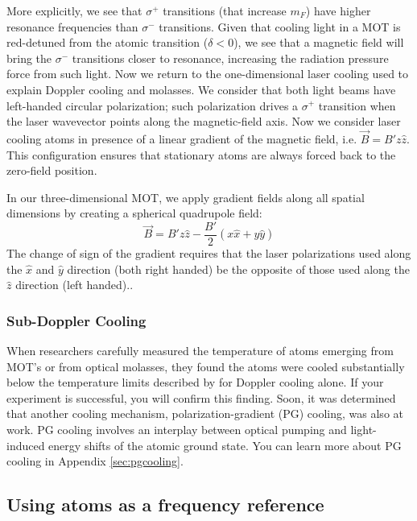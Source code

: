 \documentclass{../lab}
\begin{document}
More explicitly, we see that $\sigma^+$ transitions (that increase $m_F$) have higher resonance frequencies than $\sigma^-$ transitions. Given that cooling light in a MOT is red-detuned from the atomic transition ($\delta <0$), we see that a magnetic field will bring the $\sigma^-$ transitions closer to resonance, increasing the radiation pressure force from such light. Now we return to the one-dimensional laser cooling used to explain Doppler cooling and molasses. We consider that both light beams have left-handed circular polarization; such polarization drives a $\sigma^+$ transition when the laser wavevector points along the magnetic-field axis. Now we consider laser cooling atoms in presence of a linear gradient of the magnetic field, i.e. $\vec{B} = B'z\hat{z}$. This configuration ensures that stationary atoms are always forced back to the zero-field position.

In our three-dimensional MOT, we apply gradient fields along all spatial dimensions by creating a spherical quadrupole field:
\begin{equation}
    \vec{B} = B'z\hat{z} - \frac{B'}{2}(x\hat{x} + y\hat{y})
\end{equation}
The change of sign of the gradient requires that the laser polarizations used along the $\hat{x}$ and $\hat{y}$ direction (both right handed) be the opposite of those used along the $\hat{z}$ direction (left handed)..

\subsubsection{Sub-Doppler Cooling}

When researchers carefully measured the temperature of atoms emerging from MOT’s or from optical molasses, they found the atoms were cooled substantially below the temperature limits described by  for Doppler cooling alone. If your experiment is successful, you will confirm this finding.  Soon, it was determined that another cooling mechanism, polarization-gradient (PG) cooling, was also at work. PG cooling involves an interplay between optical pumping and light-induced energy shifts of the atomic ground state.  You can learn more about PG cooling in  Appendix \ref{sec:pgcooling}.


\subsection{Using atoms as a frequency reference}
\end{document}
